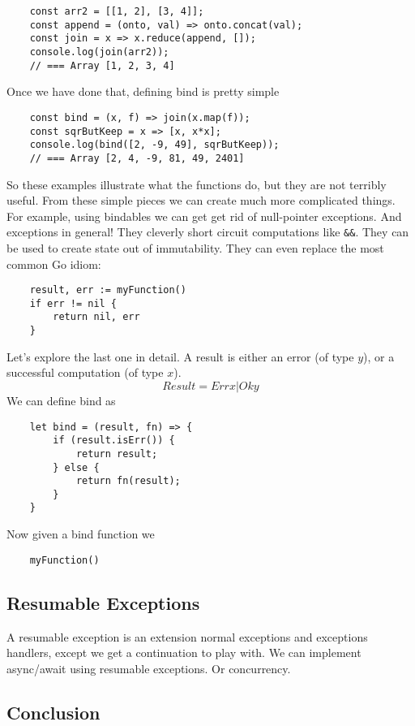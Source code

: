 \begin{verbatim}
    const arr2 = [[1, 2], [3, 4]];
    const append = (onto, val) => onto.concat(val);
    const join = x => x.reduce(append, []);
    console.log(join(arr2));
    // === Array [1, 2, 3, 4]
\end{verbatim}
Once we have done that, defining bind is pretty simple
\begin{verbatim}
    const bind = (x, f) => join(x.map(f));
    const sqrButKeep = x => [x, x*x];
    console.log(bind([2, -9, 49], sqrButKeep));
    // === Array [2, 4, -9, 81, 49, 2401]
\end{verbatim}

So these examples illustrate what the functions do,
but they are not terribly useful.
From these simple pieces we can create much
more complicated things.
For example, using bindables we can get get rid of null-pointer exceptions.
And exceptions in general!
They cleverly short circuit computations like \texttt{\&\&}.
They can be used to create state out of immutability.
They can even replace the most common Go idiom:
\begin{verbatim}
    result, err := myFunction()
    if err != nil {
        return nil, err
    }
\end{verbatim}
Let's explore the last one in detail.
A result is either an error (of type $y$),
or a successful computation (of type $x$).
\begin{equation}
    Result = Err x | Ok y
\end{equation}
We can define bind as
\begin{verbatim}
    let bind = (result, fn) => {
        if (result.isErr()) {
            return result;
        } else {
            return fn(result);
        }
    }
\end{verbatim}
Now given a bind function we
\begin{verbatim}
    myFunction()
\end{verbatim}

\subsection{Resumable Exceptions}
A resumable exception is an extension normal exceptions
and exceptions handlers, except we get a continuation to play with.
We can implement async/await using resumable exceptions.
Or concurrency.

\subsection{Conclusion}

